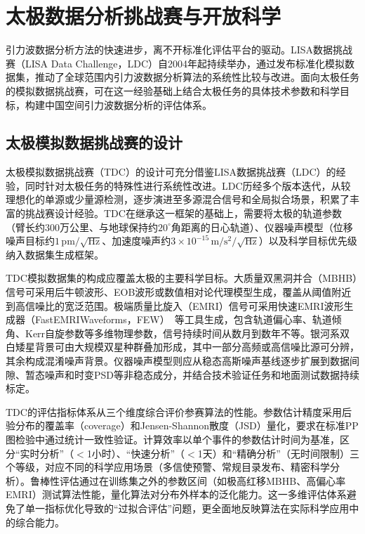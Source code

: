 \section{太极数据分析挑战赛与开放科学}

引力波数据分析方法的快速进步，离不开标准化评估平台的驱动。LISA数据挑战赛（LISA Data Challenge，LDC）自2004年起持续举办，通过发布标准化模拟数据集，推动了全球范围内引力波数据分析算法的系统性比较与改进。面向太极任务的模拟数据挑战赛，可在这一经验基础上结合太极任务的具体技术参数和科学目标，构建中国空间引力波数据分析的评估体系。

\subsection{太极模拟数据挑战赛的设计}

太极模拟数据挑战赛（TDC）的设计可充分借鉴LISA数据挑战赛（LDC）的经验，同时针对太极任务的特殊性进行系统性改进。LDC历经多个版本迭代，从较理想化的单源或少量源检测，逐步演进至多源混合信号和全局拟合场景，积累了丰富的挑战赛设计经验。TDC在继承这一框架的基础上，需要将太极的轨道参数（臂长约300万公里、与地球保持约$20^\circ$角距离的日心轨道）、仪器噪声模型（位移噪声目标约$1\,\mathrm{pm}/\sqrt{\mathrm{Hz}}$、加速度噪声约$3\times10^{-15}\,\mathrm{m/s^2}/\sqrt{\mathrm{Hz}}$）以及科学目标优先级纳入数据集生成框架。

TDC模拟数据集的构成应覆盖太极的主要科学目标。大质量双黑洞并合（MBHB）信号可采用后牛顿波形、EOB波形或数值相对论代理模型生成，覆盖从阈值附近到高信噪比的宽泛范围。极端质量比旋入（EMRI）信号可采用快速EMRI波形生成器（FastEMRIWaveforms，FEW）~\cite{Chua2021FEW}等工具生成，包含轨道偏心率、轨道倾角、Kerr自旋参数等多维物理参数，信号持续时间从数月到数年不等。银河系双白矮星背景可由大规模双星种群叠加形成，其中一部分高频或高信噪比源可分辨，其余构成混淆噪声背景。仪器噪声模型则应从稳态高斯噪声基线逐步扩展到数据间隙、暂态噪声和时变PSD等非稳态成分，并结合技术验证任务和地面测试数据持续标定。

TDC的评估指标体系从三个维度综合评价参赛算法的性能。参数估计精度采用后验分布的覆盖率（coverage）和Jensen-Shannon散度（JSD）量化，要求在标准PP图检验中通过统计一致性验证。计算效率以单个事件的参数估计时间为基准，区分“实时分析”（$<$1小时）、“快速分析”（$<$1天）和“精确分析”（无时间限制）三个等级，对应不同的科学应用场景（多信使预警、常规目录发布、精密科学分析）。鲁棒性评估通过在训练集之外的参数区间（如极高红移MBHB、高偏心率EMRI）测试算法性能，量化算法对分布外样本的泛化能力。这一多维评估体系避免了单一指标优化导致的“过拟合评估”问题，更全面地反映算法在实际科学应用中的综合能力。

